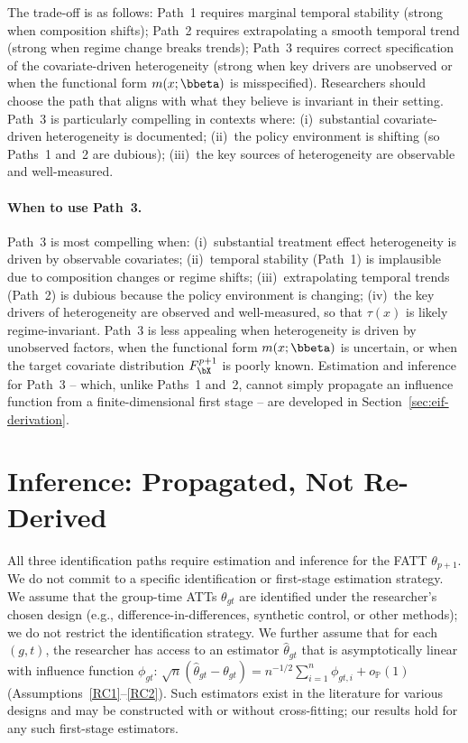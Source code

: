 \documentclass{article}
\renewcommand{\P}{\mathbb{P}}
\begin{document}
The trade-off is as follows: Path~1 requires marginal temporal stability (strong when composition shifts); Path~2 requires extrapolating a smooth temporal trend (strong when regime change breaks trends); Path~3 requires correct specification of the covariate-driven heterogeneity (strong when key drivers are unobserved or when the functional form $m(x;\bbeta)$ is misspecified). Researchers should choose the path that aligns with what they believe is invariant in their setting. Path~3 is particularly compelling in contexts where: (i)~substantial covariate-driven heterogeneity is documented; (ii)~the policy environment is shifting (so Paths~1 and~2 are dubious); (iii)~the key sources of heterogeneity are observable and well-measured.

\paragraph{When to use Path~3.} Path~3 is most compelling when: (i)~substantial treatment effect heterogeneity is driven by observable covariates; (ii)~temporal stability (Path~1) is implausible due to composition changes or regime shifts; (iii)~extrapolating temporal trends (Path~2) is dubious because the policy environment is changing; (iv)~the key drivers of heterogeneity are observed and well-measured, so that $\tau(x)$ is likely regime-invariant. Path~3 is less appealing when heterogeneity is driven by unobserved factors, when the functional form $m(x;\bbeta)$ is uncertain, or when the target covariate distribution $F_{\bX}^{p+1}$ is poorly known. Estimation and inference for Path~3 -- which, unlike Paths~1 and~2, cannot simply propagate an influence function from a finite-dimensional first stage -- are developed in Section~\ref{sec:eif-derivation}.

\section{Inference: Propagated, Not Re-Derived}\label{sec:eif}\label{sec:inference}

All three identification paths require estimation and inference for the FATT $\theta_{p+1}$. We do not commit to a specific identification or first-stage estimation strategy. We assume that the group-time ATTs $\theta_{gt}$ are identified under the researcher's chosen design (e.g., difference-in-differences, synthetic control, or other methods); we do not restrict the identification strategy. We further assume that for each $(g,t)$, the researcher has access to an estimator $\widehat{\theta}_{gt}$ that is asymptotically linear with influence function $\phi_{gt}$: $\sqrt{n}(\widehat{\theta}_{gt} - \theta_{gt}) = n^{-1/2}\sum_{i=1}^n \phi_{gt,i} + o_{\P}(1)$ (Assumptions~\ref{RC1}--\ref{RC2}). Such estimators exist in the literature for various designs \citep{callawayDifferenceindifferencesMultipleTime2021} and may be constructed with or without cross-fitting; our results hold for any such first-stage estimators.
\end{document}
